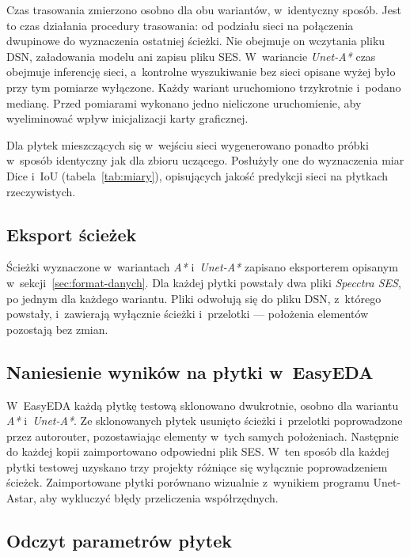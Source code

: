 Czas trasowania zmierzono osobno dla obu wariantów, w~identyczny sposób.
Jest to czas działania procedury trasowania: od podziału sieci na
połączenia dwupinowe do wyznaczenia ostatniej ścieżki. Nie obejmuje on
wczytania pliku DSN, załadowania modelu ani zapisu pliku SES.
W~wariancie \emph{Unet-A*} czas obejmuje inferencję sieci, a~kontrolne
wyszukiwanie bez sieci opisane wyżej było przy tym pomiarze wyłączone.
Każdy wariant uruchomiono trzykrotnie i~podano medianę. Przed pomiarami
wykonano jedno nieliczone uruchomienie, aby wyeliminować wpływ
inicjalizacji karty graficznej.

Dla płytek mieszczących się w~wejściu sieci wygenerowano ponadto próbki
w~sposób identyczny jak dla zbioru uczącego. Posłużyły one do wyznaczenia
miar Dice i~IoU (tabela~\ref{tab:miary}), opisujących jakość predykcji sieci
na płytkach rzeczywistych.

\subsection{Eksport ścieżek}
\label{sec:exp-ses}

Ścieżki wyznaczone w~wariantach \emph{A*} i~\emph{Unet-A*} zapisano
eksporterem opisanym w~sekcji~\ref{sec:format-danych}. Dla każdej płytki
powstały dwa pliki \emph{Specctra SES}, po jednym dla każdego wariantu.
Pliki odwołują się do pliku DSN, z~którego powstały, i~zawierają wyłącznie
ścieżki i~przelotki --- położenia elementów pozostają bez zmian.

\subsection{Naniesienie wyników na płytki w~EasyEDA}
\label{sec:exp-import}

W~EasyEDA każdą płytkę testową sklonowano dwukrotnie, osobno dla wariantu
\emph{A*} i~\emph{Unet-A*}. Ze sklonowanych płytek usunięto ścieżki
i~przelotki poprowadzone przez autorouter, pozostawiając elementy w~tych
samych położeniach. Następnie do każdej kopii zaimportowano odpowiedni plik
SES. W~ten sposób dla każdej płytki testowej uzyskano trzy projekty
różniące się wyłącznie poprowadzeniem ścieżek. Zaimportowane płytki
porównano wizualnie z~wynikiem programu Unet-Astar, aby wykluczyć błędy
przeliczenia współrzędnych.

\subsection{Odczyt parametrów płytek}
\label{sec:exp-odczyt}

